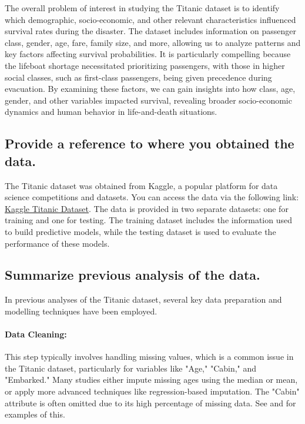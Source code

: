 \documentclass[twoside,11pt]{article}
\begin{document}
The overall problem of interest in studying the Titanic dataset is to identify which demographic, socio-economic, and other relevant characteristics influenced survival rates during the disaster. The dataset includes information on passenger class, gender, age, fare, family size, and more, allowing us to analyze patterns and key factors affecting survival probabilities. It is particularly compelling because the lifeboat shortage necessitated prioritizing passengers, with those in higher social classes, such as first-class passengers, being given precedence during evacuation. By examining these factors, we can gain insights into how class, age, gender, and other variables impacted survival, revealing broader socio-economic dynamics and human behavior in life-and-death situations.

\subsection*{Provide a reference to where you obtained the data.}

The Titanic dataset was obtained from Kaggle, a popular platform for data science competitions and datasets. You can access the data via the following link: \href{https://www.kaggle.com/c/titanic/data}{Kaggle Titanic Dataset}. The data is provided in two separate datasets: one for training and one for testing. The training dataset includes the information used to build predictive models, while the testing dataset is used to evaluate the performance of these models.

\subsection*{Summarize previous analysis of the data.}

In previous analyses of the Titanic dataset, several key data preparation and modelling techniques have been employed.

\paragraph{Data Cleaning:} This step typically involves handling missing values, which is a common issue in the Titanic dataset, particularly for variables like "Age," "Cabin," and "Embarked." Many studies either impute missing ages using the median or mean, or apply more advanced techniques like regression-based imputation. The "Cabin" attribute is often omitted due to its high percentage of missing data. See \cite{droste} and \cite{hackers} for examples of this.
\end{document}
